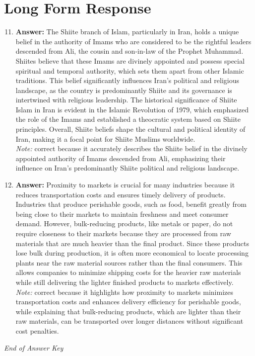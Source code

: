 \documentclass[12pt]{article}
\begin{document}
\section*{Long Form Response}
\begin{enumerate}[label=\arabic*.]
\setcounter{enumi}{10}
\item \textbf{Answer:} The Shiite branch of Islam, particularly in Iran, holds a unique belief in the authority of Imams who are considered to be the rightful leaders descended from Ali, the cousin and son-in-law of the Prophet Muhammad. Shiites believe that these Imams are divinely appointed and possess special spiritual and temporal authority, which sets them apart from other Islamic traditions. This belief significantly influences Iran's political and religious landscape, as the country is predominantly Shiite and its governance is intertwined with religious leadership. The historical significance of Shiite Islam in Iran is evident in the Islamic Revolution of 1979, which emphasized the role of the Imams and established a theocratic system based on Shiite principles. Overall, Shiite beliefs shape the cultural and political identity of Iran, making it a focal point for Shiite Muslims worldwide.
\\ \textit{Note:} correct because it accurately describes the Shiite belief in the divinely appointed authority of Imams descended from Ali, emphasizing their influence on Iran's predominantly Shiite political and religious landscape.
\item \textbf{Answer:} Proximity to markets is crucial for many industries because it reduces transportation costs and ensures timely delivery of products. Industries that produce perishable goods, such as food, benefit greatly from being close to their markets to maintain freshness and meet consumer demand. However, bulk-reducing products, like metals or paper, do not require closeness to their markets because they are processed from raw materials that are much heavier than the final product. Since these products lose bulk during production, it is often more economical to locate processing plants near the raw material sources rather than the final consumers. This allows companies to minimize shipping costs for the heavier raw materials while still delivering the lighter finished products to markets effectively.
\\ \textit{Note:} correct because it highlights how proximity to markets minimizes transportation costs and enhances delivery efficiency for perishable goods, while explaining that bulk-reducing products, which are lighter than their raw materials, can be transported over longer distances without significant cost penalties.
\end{enumerate}

\vfill
\noindent\textit{End of Answer Key}
\end{document}
